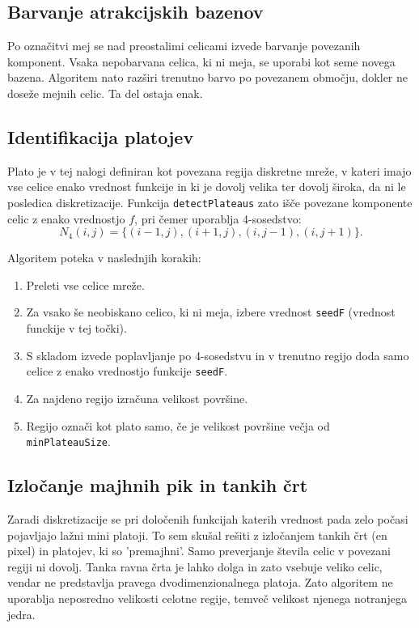 \documentclass[12pt,a4paper]{article}
\begin{document}
    \subsection{Barvanje atrakcijskih bazenov}
    
    Po označitvi mej se nad preostalimi celicami izvede barvanje povezanih komponent. Vsaka nepobarvana celica, ki ni meja, se uporabi kot seme novega bazena. Algoritem nato razširi trenutno barvo po povezanem območju, dokler ne doseže mejnih celic. Ta del ostaja enak.
    
    
    \subsection{Identifikacija platojev}
    
    Plato je v tej nalogi definiran kot povezana regija diskretne mreže, v kateri imajo vse celice enako vrednost funkcije in ki je dovolj velika ter dovolj široka, da ni le posledica diskretizacije. Funkcija \texttt{detectPlateaus} zato išče povezane komponente celic z enako vrednostjo \(f\), pri čemer uporablja 4-sosedstvo:
    \[
    N_4(i,j)=\{(i-1,j),(i+1,j),(i,j-1),(i,j+1)\}.
    \]
    
    Algoritem poteka v naslednjih korakih:
    
    \begin{enumerate}[label=\arabic*.]
        \item Preleti vse celice mreže.
        \item Za vsako še neobiskano celico, ki ni meja, izbere vrednost \texttt{seedF} (vrednost funckije v tej točki).
        \item S skladom izvede poplavljanje po 4-sosedstvu in v trenutno regijo doda samo celice z enako vrednostjo funkcije \texttt{seedF}.
        \item Za najdeno regijo izračuna velikost površine.
        \item Regijo označi kot plato samo, če je velikost površine večja od \texttt{minPlateauSize}.
    \end{enumerate}
    
    
    \subsection{Izločanje majhnih pik in tankih črt}
    
    Zaradi diskretizacije se pri določenih funkcijah katerih vrednost pada zelo počasi pojavljajo lažni mini platoji. To sem skušal rešiti z izločanjem tankih črt (en pixel) in platojev, ki so 'premajhni'.
    Samo preverjanje števila celic v povezani regiji ni dovolj. Tanka ravna črta je lahko dolga in zato vsebuje veliko celic, vendar ne predstavlja pravega dvodimenzionalnega platoja. Zato algoritem ne uporablja neposredno velikosti celotne regije, temveč velikost njenega notranjega jedra.
    
\end{document}
